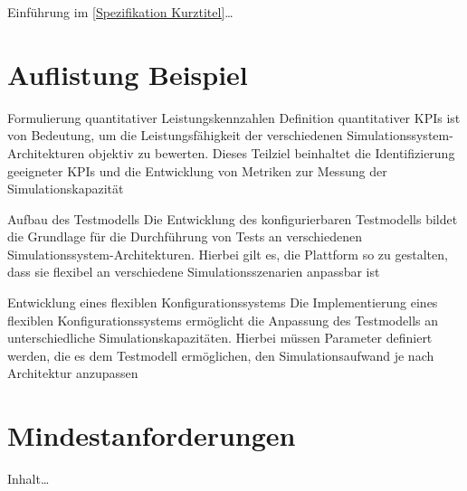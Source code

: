 
Einführung im \autoref{Spezifikation Kurztitel}\ldots

\section{Auflistung Beispiel}

\begin{Itemize}
  \item Formulierung quantitativer Leistungskennzahlen
  \newline
  Definition quantitativer KPIs ist von Bedeutung, um die Leistungsfähigkeit der
  verschiedenen Simulationssystem-Architekturen objektiv zu bewerten. Dieses Teilziel
  beinhaltet die Identifizierung geeigneter KPIs und die Entwicklung von Metriken zur Messung
  der Simulationskapazität
  \item Aufbau des Testmodells
  \newline
  Die Entwicklung des konfigurierbaren Testmodells bildet die Grundlage für die Durchführung von
  Tests an verschiedenen Simulationssystem-Architekturen. Hierbei gilt es, die Plattform so zu gestalten,
  dass sie flexibel an verschiedene Simulationsszenarien anpassbar ist
  \item Entwicklung eines flexiblen Konfigurationssystems
  \newline
  Die Implementierung eines flexiblen Konfigurationssystems ermöglicht die Anpassung des Testmodells an
  unterschiedliche Simulationskapazitäten. Hierbei müssen Parameter definiert werden, die es dem Testmodell
  ermöglichen, den Simulationsaufwand je nach Architektur anzupassen
\end{Itemize}

\section{Mindestanforderungen}

Inhalt\ldots
